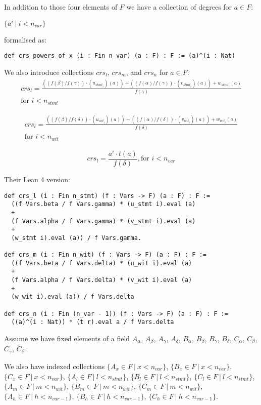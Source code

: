 \documentclass{article}
\theoremstyle{definition}
\theoremstyle{remark}
\begin{document}
In addition to those four elements of $F$ we have a collection of degrees for $a \in F$:
\begin{center}
$\{ a^i \: | \: i < n_{var} \}$
\end{center}
formalised as:
\begin{lstlisting}
def crs_powers_of_x (i : Fin n_var) (a : F) : F := (a)^(i : Nat)
\end{lstlisting}

We also introduce collections $crs_l$, $crs_m$, and $crs_n$ for $a \in F$:
\begin{multline}
crs_l = \frac{((f(\beta) / f(\gamma)) \cdot (u_{{stmt}_i})(a)) + ((f(\alpha) / f(\gamma)) \cdot (v_{{stmt}_i})(a)) + w_{{stmt}_i}(a)}{f(\gamma)} \\ \text{for $i < n_{stmt}$}
\end{multline}

\begin{multline}
crs_l = \frac{((f(\beta) / f(\delta)) \cdot (u_{{wit}_i})(a)) + ((f(\alpha) / f(\delta)) \cdot (v_{{wit}_i})(a)) + w_{{wit}_i}(a)}{f(\delta)} \\ \text{for $i < n_{wit}$}
\end{multline}

\begin{equation}
crs_l = \frac{a^i \cdot t(a)}{f(\delta)}, \text{for $i < n_{var}$}
\end{equation}

Their Lean 4 version:

\begin{lstlisting}
def crs_l (i : Fin n_stmt) (f : Vars -> F) (a : F) : F :=
  ((f Vars.beta / f Vars.gamma) * (u_stmt i).eval (a)
  +
  (f Vars.alpha / f Vars.gamma) * (v_stmt i).eval (a)
  +
  (w_stmt i).eval (a)) / f Vars.gamma.

def crs_m (i : Fin n_wit) (f : Vars -> F) (a : F) : F :=
  ((f Vars.beta / f Vars.delta) * (u_wit i).eval (a)
  +
  (f Vars.alpha / f Vars.delta) * (v_wit i).eval (a)
  +
  (w_wit i).eval (a)) / f Vars.delta

def crs_n (i : Fin (n_var - 1)) (f : Vars -> F) (a : F) : F :=
  ((a)^(i : Nat)) * (t r).eval a / f Vars.delta
\end{lstlisting}

Assume we have fixed elements of a field $A_{\alpha}$, $A_{\beta}$, $A_{\gamma}$, $A_{\delta}$, $B_{\alpha}$, $B_{\beta}$, $B_{\gamma}$, $B_{\delta}$, $C_{\alpha}$, $C_{\beta}$, $C_{\gamma}$, $C_{\delta}$.

We also have indexed collections $\{ A_x \in F \: | \: x < n_{var} \}$, $\{ B_x \in F \: | \: x < n_{var} \}$, $\{ C_x \in F \: | \: x < n_{var} \}$, $\{ A_l \in F \: | \: l < n_{stmt} \}$, $\{ B_l \in F \: | \: l < n_{stmt} \}$, $\{ C_l \in F \: | \: l < n_{stmt} \}$, $\{ A_m \in F \: | \: m < n_{wit} \}$, $\{ B_m \in F \: | \: m < n_{wit} \}$, $\{ C_m \in F \: | \: m < n_{wit} \}$, $\{ A_h \in F \: | \: h < n_{var - 1} \}$, $\{ B_h \in F \: | \: h < n_{var - 1} \}$, $\{ C_h \in F \: | \: h < n_{var - 1} \}$.
\end{document}

